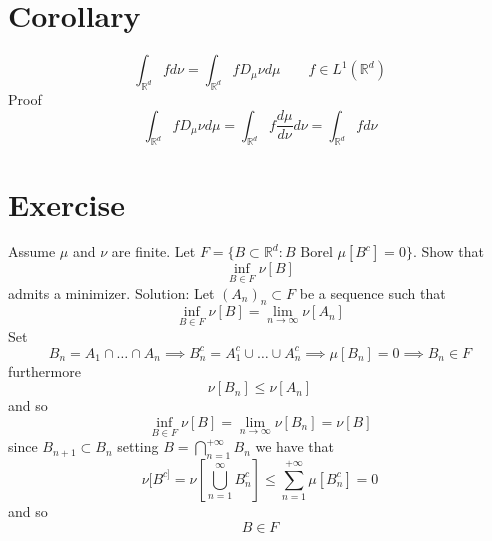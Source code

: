 \documentclass[11pt]{article}
\begin{document}
\section{Corollary}
\[
\int_{ \mathbb{R}^{d}}^{}f d\nu = \int_{ \mathbb{R}^{d}}{}f D_\mu \nu d \mu \qquad f \in L^{1}( \mathbb{R}^{d})
\] 
Proof
\[
\int_{ \mathbb{R}^{d}}^{}f D_\mu \nu d \mu = \int_{ \mathbb{R}^{d}}^{} f \frac{d \mu}{d \nu} d \nu = \int_{ \mathbb{R}^{d}}^{}f d \nu
\] 

\section{Exercise}
Assume $\mu$ and $\nu$ are finite. Let  $F = \{B \subset \mathbb{R}^{d} : B \text{ Borel } \mu[B^{c}] = 0\}$.
Show that
\[
    \inf_{B \in F} \nu[B]
\] 
admits a minimizer.
Solution: Let $(A_n)_n \subset F$ be a sequence such that 
\[
    \inf_{B \in F} \nu[B] = \lim_{n\to \infty}\nu[A_n]
\] 
Set
\[
    B_n = A_1 \cap \dots \cap A_n \implies B_n^{c} = A_1^{c} \cup \dots \cup A_n^{c} \implies \mu[B_n] = 0 \implies B_n \in F
\] 
furthermore
\[
    \nu[B_n] \le \nu[A_n]
\] 
and so
\[
    \inf_{B \in F} \nu[B] = \lim_{n\to \infty}\nu[B_n] = \nu[B]
\] 
since $B_{n+1} \subset B_n$ setting $B = \bigcap_{n=1}^{+\infty}B_n$ we have that 
\[
    \nu[B^{c]} = \nu[\bigcup_{n=1}^{\infty}B_n^{c}] \le \sum_{n=1}^{+\infty}\mu[B_n^{c}] = 0
\] 
and so
\[
B \in F
\] 
\end{document}
